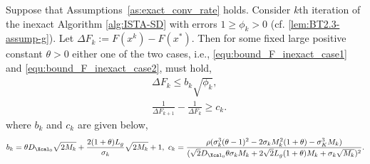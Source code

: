 \documentclass[11pt]{article}
\numberwithin{equation}{section}
\begin{document}
\begin{lemma}
	Suppose that Assumptions~\ref{as:exact_conv_rate} holds. 
	Consider $k$th iteration of the inexact Algorithm \ref{alg:ISTA-SD} with errors $1 \geq \phi_k>0$ (cf. \eqref{lem:BT2.3-assump-g}). Let $\Delta F_k := F(x^k) - F(x^*)$. Then for some fixed large positive constant $\theta > 0$ either one of the two cases, i.e., \eqref{equ:bound_F_inexact_case1} and \eqref{equ:bound_F_inexact_case2}, must hold,
	\begin{align}
		\label{equ:bound_F_inexact_case1}
	    &\Delta F_k \leq b_k\sqrt{\phi_k}, \\
	    \label{equ:bound_F_inexact_case2}
	    &\frac{1}{\Delta F_{k+1}}-\frac{1}{\Delta F_{k}}\geq c_k.
	\end{align}
	where $b_k$ and $c_k$ are given below,
	\begin{align*}
	    b_k = \theta D_{\Xcal_0}\sqrt{2M_k}+  \frac{2(1+\theta)L_g}{\sigma_k}\sqrt{2M_k} + 1, ~c_k=\frac{\rho(\sigma_k^3(\theta-1)^2 - 2\sigma_kM_k^2(1+\theta) - \sigma_K^3M_k )}{(\sqrt{2}D_{\Xcal_0}\theta\sigma_kM_k + 2\sqrt{2}L_g(1+\theta)M_k + \sigma_k\sqrt{M_k} )^2}.
	\end{align*}
\end{lemma}
\end{document}
